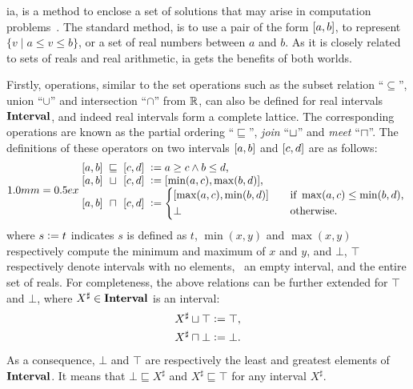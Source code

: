 \Gls{ia}, is a method to enclose a set of solutions that may arise in
computation problems~\cite{moore}.  The standard method, is to use a pair of
the form $\left[{a}, {b}\right]$, to represent $\{ v \mid a \leq v \leq b \}$, or a
set of real numbers between $a$ and $b$.  As it is closely related to sets of
reals and real arithmetic, \gls{ia} gets the benefits of both worlds.

Firstly, operations, similar to the set operations such as the subset relation
``$\subseteq$'', union ``$\cup$'' and intersection ``$\cap$'' from $\mathbb{R}$,
can also be defined for real intervals $\mathbf{Interval}$, and indeed real
intervals form a complete lattice.  The corresponding operations are known
as the partial ordering ``$\sqsubseteq$'', \emph{join} ``$\sqcup$'' and
\emph{meet} ``$\sqcap$''.  The definitions of these operators on two intervals
$\left[{a}, {b}\right]$ and $\left[{c}, {d}\right]$ are as follows:
\begin{equation}
    \arraycolsep=0.5ex
    \begin{array}{lcll}
        \interval{a}{b} & \sqsubseteq & \interval{c}{d}
            &\defeq a \geq c \wedge b \leq d, \\
        \interval{a}{b} & \join & \interval{c}{d}
            &\defeq [\min(a, c), \max(b, d)], \\
        \interval{a}{b} & \meet & \interval{c}{d}
            &\defeq \left\{
                \begin{aligned}
                    & [\max(a, c), \min(b, d)] \quad &&
                        \text{if~} \max(a, c) \leq \min(b, d), \\
                    & \bot && \text{otherwise}.
                \end{aligned}
            \right.
    \end{array}\label{bg:eq:interval_relations}
\end{equation}
where $s \vcentcolon= t$ indicates $s$ is defined as $t$, $\min(x, y)$ and $\max(x,
y)$ respectively compute the minimum and maximum of $x$ and $y$, and $\bot$,
$\top$ respectively denote intervals with no elements, \ie~an empty interval,
and the entire set of reals.  For completeness, the above relations can be
further extended for $\top$ and $\bot$, where $X^\sharp \in \mathbf{Interval}$ is an
interval:
\begin{equation}
    \begin{aligned}
        X^\sharp \sqcup \top &\vcentcolon= \top, \\
        X^\sharp \sqcap \bot &\vcentcolon= \bot.
    \end{aligned}
\end{equation}
As a consequence, $\bot$ and $\top$ are respectively the least and greatest
elements of $\mathbf{Interval}$.  It means that $\bot \sqsubseteq X^\sharp$ and
$X^\sharp \sqsubseteq \top$ for any interval $X^\sharp$.

